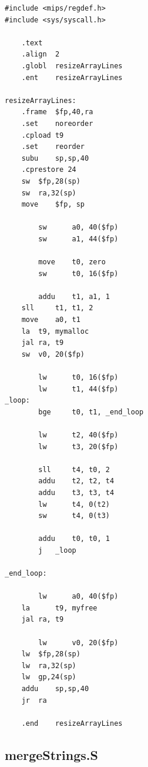 \documentclass[a4paper,11pt]{article}
\begin{document}
\lstset{language=[x86masm]Assembler, breaklines=true, basicstyle=\normalsize}
\begin{lstlisting}
#include <mips/regdef.h>
#include <sys/syscall.h>

	.text
	.align	2
	.globl	resizeArrayLines
	.ent	resizeArrayLines

resizeArrayLines:
	.frame	$fp,40,ra	
	.set	noreorder
	.cpload	t9
	.set	reorder
	subu 	sp,sp,40
	.cprestore 24
	sw	$fp,28(sp) 
	sw	ra,32(sp)
	move 	$fp, sp

        sw      a0, 40($fp)
        sw      a1, 44($fp)

        move    t0, zero
        sw      t0, 16($fp)

        addu	t1, a1, 1
	sll     t1, t1, 2
	move    a0, t1
	la	t9, mymalloc
	jal	ra, t9
	sw	v0, 20($fp)	

        lw      t0, 16($fp)
        lw      t1, 44($fp)
_loop:  
        bge     t0, t1, _end_loop

        lw      t2, 40($fp)
        lw      t3, 20($fp)

        sll     t4, t0, 2
        addu    t2, t2, t4
        addu    t3, t3, t4 
        lw      t4, 0(t2)
        sw      t4, 0(t3)

        addu    t0, t0, 1
        j   _loop

_end_loop:

        lw      a0, 40($fp)
	la      t9, myfree
	jal	ra, t9

        lw      v0, 20($fp)
	lw	$fp,28(sp)
	lw	ra,32(sp)
	lw	gp,24(sp)
	addu	sp,sp,40
	jr	ra

	.end	resizeArrayLines
\end{lstlisting}

\subsection{mergeStrings.S}
\end{document}
